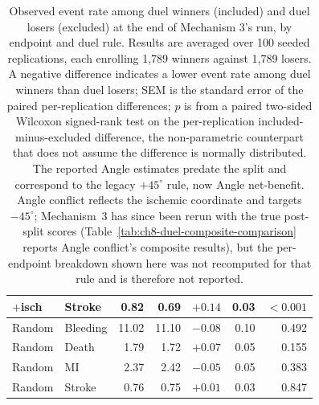 \begin{table}[htbp]
\begin{tabular}{llrrrrr}
        $+$isch     & Stroke   & 0.82  & 0.69  & $+0.14$ & 0.03 & $<0.001$ \\
        \midrule
        Random      & Bleeding & 11.02 & 11.10 & $-0.08$ & 0.10 & 0.492 \\
        Random      & Death    & 1.79  & 1.72  & $+0.07$ & 0.05 & 0.155 \\
        Random      & MI       & 2.37  & 2.42  & $-0.05$ & 0.05 & 0.383 \\
        Random      & Stroke   & 0.76  & 0.75  & $+0.01$ & 0.03 & 0.847 \\
        \bottomrule
    \end{tabular}
    \caption{Observed event rate among duel winners (included) and duel losers
    (excluded) at the end of Mechanism 3's run, by endpoint and duel rule. Results are
    averaged over 100 seeded replications, each enrolling 1,789
    winners against 1,789 losers. A negative difference indicates a lower event rate
    among duel winners than duel losers; SEM is the standard error of the paired
    per-replication differences; $p$ is from a paired two-sided Wilcoxon signed-rank test
    on the per-replication included-minus-excluded difference, the non-parametric
    counterpart that does not assume the difference is normally distributed. The
    reported Angle estimates predate the split and correspond to the legacy
    $+45^\circ$ rule, now Angle net-benefit. Angle conflict reflects the ischemic
    coordinate and targets $-45^\circ$; Mechanism~3 has since been rerun with the
    true post-split scores (Table~\ref{tab:ch8-duel-composite-comparison} reports
    Angle conflict's composite results), but the per-endpoint breakdown shown here
    was not recomputed for that rule and is therefore not reported.}
    \label{tab:ch8-duel-rate-comparison}
\end{table}
